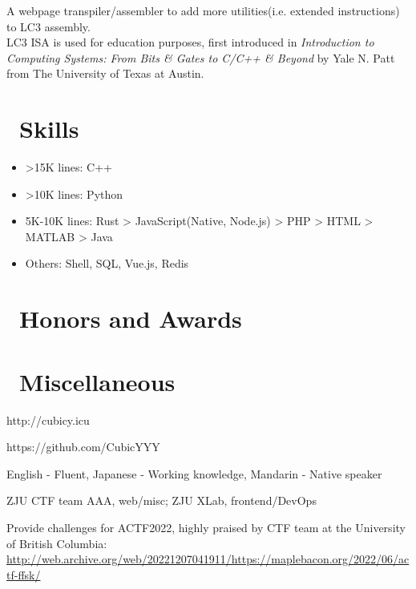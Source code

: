 \documentclass{resume}
\begin{document}
A webpage transpiler/assembler to add more utilities(i.e. extended instructions) to LC3 assembly. \\
LC3 ISA is used for education purposes, first introduced in \textit{Introduction to Computing Systems: From Bits \& Gates to C/C++ \& Beyond} 
by Yale N. Patt from The University of Texas at Austin.

\section{\faCogs\ Skills}
\begin{itemize}[parsep=0.5ex]
  \item >15K lines: C++
  \item >10K lines: Python
  \item 5K-10K lines: Rust > JavaScript(Native, Node.js) > PHP > HTML > MATLAB > Java
  \item Others: Shell, SQL, Vue.js, Redis
\end{itemize}


\section{\faHeartO\ Honors and Awards}

\section{\faInfo\ Miscellaneous}
\begin{description}[parsep=0.5ex]
  \item[Blog] http://cubicy.icu
  \item[GitHub] https://github.com/CubicYYY
  \item[Languages] English - Fluent, Japanese - Working knowledge, Mandarin - Native speaker
  \item[Team] ZJU CTF team AAA, web/misc; ZJU XLab, frontend/DevOps
  \item[Other] Provide challenges for ACTF2022, highly praised by CTF team at the University of British Columbia: \href{http://web.archive.org/web/20221207041911/https://maplebacon.org/2022/06/actf-ffsk/}{http://web.archive.org/web/20221207041911/https://maplebacon.org/2022/06/actf-ffsk/}
\end{description}

%
%
\end{document}
